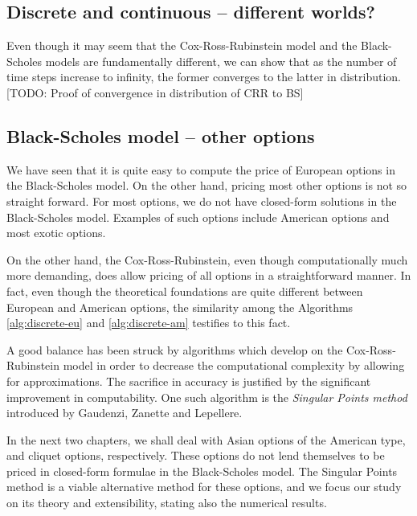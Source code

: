 \subsection{Discrete and continuous -- different worlds?}

Even though it may seem that the Cox-Ross-Rubinstein model and the Black-Scholes models are fundamentally different, we can show that as the number of time steps increase to infinity, the former converges to the latter in distribution.
[TODO: Proof of convergence in distribution of CRR to BS]



\subsection{Black-Scholes model -- other options}
\label{subsec:continuous-other}

We have seen that it is quite easy to compute the price of European options in the Black-Scholes model. On the other hand, pricing most other options is not so straight forward. For most options, we do not have closed-form solutions in the Black-Scholes model. Examples of such options include American options and most exotic options.

On the other hand, the Cox-Ross-Rubinstein, even though computationally much more demanding, does allow pricing of all options in a straightforward manner. In fact, even though the theoretical foundations are quite different between European and American options, the similarity among the Algorithms \ref{alg:discrete-eu} and \ref{alg:discrete-am} testifies to this fact.

A good balance has been struck by algorithms which develop on the Cox-Ross-Rubinstein model in order to decrease the computational complexity by allowing for approximations. The sacrifice in accuracy is justified by the significant improvement in computability. One such algorithm is the \emph{Singular Points method} introduced by Gaudenzi, Zanette and Lepellere. 

In the next two chapters, we shall deal with Asian options of the American type, and cliquet options, respectively. These options do not lend themselves to be priced in closed-form formulae in the Black-Scholes model. The Singular Points method is a viable alternative method for these options, and we focus our study on its theory and extensibility, stating also the numerical results.


